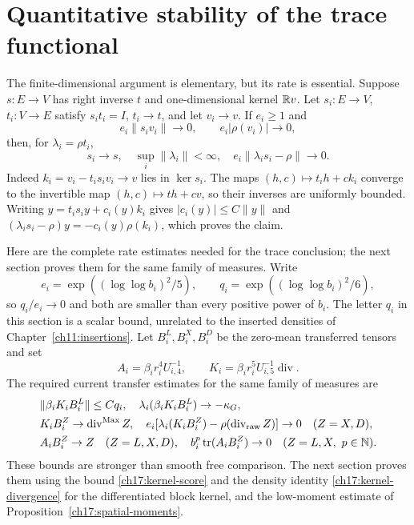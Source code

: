 


\section{Quantitative stability of the trace functional}
\label{ch17:stability}

The finite-dimensional argument is elementary, but its rate is essential.
Suppose $s:E\to V$ has right inverse $t$ and one-dimensional kernel
$\mathbb R v$. Let $s_i:E\to V$, $t_i:V\to E$ satisfy
$s_it_i=I$, $t_i\to t$, and let $v_i\to v$. If $e_i\ge1$ and
\[
 e_i\|s_iv_i\|\to0,\qquad e_i|\rho(v_i)|\to0,
\]
then, for $\lambda_i=\rho t_i$,
\begin{equation}
 s_i\to s,\quad \sup_i\|\lambda_i\|<\infty,
              \quad e_i\|\lambda_is_i-\rho\|\to0.
 \label{ch17:stable-functional}
\end{equation}
Indeed $k_i=v_i-t_is_iv_i\to v$ lies in $\ker s_i$. The maps
$(h,c)\mapsto t_ih+ck_i$ converge to the invertible map
$(h,c)\mapsto th+cv$, so their inverses are uniformly bounded.
Writing $y=t_is_iy+c_i(y)k_i$ gives $|c_i(y)|\le C\|y\|$ and
$(\lambda_is_i-\rho)y=-c_i(y)\rho(k_i)$, which proves the claim.

Here are the complete rate estimates needed for the trace conclusion;
the next section proves them for the same family of measures.
Write
\[
 e_i=\exp((\log\log b_i)^2/5),\qquad
 q_i=\exp((\log\log b_i)^2/6),
\]
so $q_i/e_i\to0$ and both are smaller than every positive power of
$b_i$. The letter $q_i$ in this section is a scalar bound, unrelated
to the inserted densities of Chapter~\ref{ch11:insertions}.
Let $B_i^L,B_i^X,B_i^D$ be the zero-mean transferred tensors and set
\[
 A_i=\beta_i r_i^4 U_{i,4}^{-1},\qquad
 K_i=\beta_i r_i^5 U_{i,5}^{-1}\operatorname{div}.
\]
The required current transfer estimates for the same family of measures are
\begin{align}
 &\|\beta_iK_iB_i^L\|\le Cq_i,\quad
             \lambda_i(\beta_iK_iB_i^L)\to-\kappa_G,
 \label{ch17:transfer}\\
 &K_iB_i^Z\to\operatorname{div}^{\rm Max}Z,\quad
 e_i[\lambda_i(K_iB_i^Z)-\rho(\operatorname{div}_{\rm raw}Z)]\to0
                       \quad(Z=X,D),\notag\\
 &A_iB_i^Z\to Z\quad(Z=L,X,D),\quad
 b_i^p\operatorname{tr}(A_iB_i^Z)\to0
                       \quad(Z=L,X,\ p\in\mathbb N).\notag
\end{align}
These bounds are stronger than smooth free comparison. The next section
proves them using the bound \eqref{ch17:kernel-score} and the density identity \eqref{ch17:kernel-divergence} for the differentiated block kernel, and the low-moment
estimate of Proposition~\ref{ch17:spatial-moments}.

